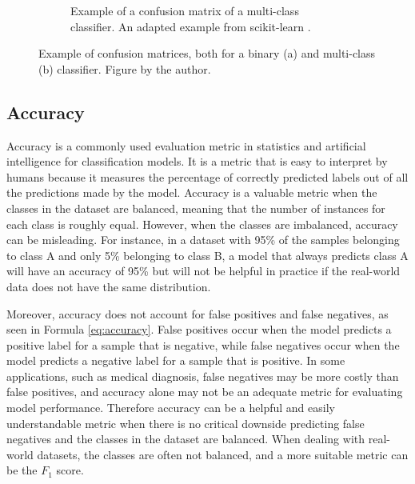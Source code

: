 \begin{figure}[htb]
{\begin{subfigure}[b]{0.5\textwidth}
             \caption{Example of a confusion matrix of a multi-class classifier. An adapted example from scikit-learn \cite{ConfusionMatrix}.}
             \label{fig:confusion_multi}
         \end{subfigure}
         }
        \caption{Example of confusion matrices, both for a binary (a) and multi-class (b) classifier. Figure by the author.}
        \label{fig:confusion_matrices}
    \end{figure}


    \subsection{Accuracy}

    Accuracy is a commonly used evaluation metric in statistics and artificial intelligence for classification models. It is a metric that is easy to interpret by humans because it measures the percentage of correctly predicted labels out of all the predictions made by the model. Accuracy is a valuable metric when the classes in the dataset are balanced, meaning that the number of instances for each class is roughly equal. However, when the classes are imbalanced, accuracy can be misleading. For instance, in a dataset with 95\% of the samples belonging to class A and only 5\% belonging to class B, a model that always predicts class A will have an accuracy of 95\% but will not be helpful in practice if the real-world data does not have the same distribution.

    Moreover, accuracy does not account for false positives and false negatives, as seen in Formula \ref{eq:accuracy}. False positives occur when the model predicts a positive label for a sample that is negative, while false negatives occur when the model predicts a negative label for a sample that is positive. In some applications, such as medical diagnosis, false negatives may be more costly than false positives, and accuracy alone may not be an adequate metric for evaluating model performance. Therefore accuracy can be a helpful and easily understandable metric when there is no critical downside predicting false negatives and the classes in the dataset are balanced. When dealing with real-world datasets, the classes are often not balanced, and a more suitable metric can be the $F_1$ score.
    


